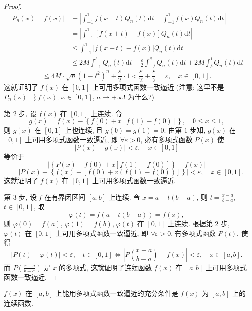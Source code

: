 \begin{proof}
\[\]
\[
  \begin{aligned}
    |P_{n}(x)-f(x)|&=\left|\int_{-1}^{1}f(x+t)Q_{n}(t)\mathrm{d}t-\int_{-1}^{1}f(x)Q_{n}(t)\mathrm{d}t\right|\\
    &=\left|\int_{-1}^{1}[f(x+t)-f(x)]Q_{n}(t)\mathrm{d}t\right|\\
    &\leqslant\int_{-1}^{1}|f(x+t)-f(x)|Q_{n}(t)\mathrm{d}t\\
    &\leqslant2M\int_{-1}^{\delta}Q_{n}(t)\mathrm{d}t+\frac{\varepsilon}{2}\int_{-\delta}^{\delta}Q_{n}(t)\mathrm{d}t+2M\int_{\delta}^{1}Q_{n}(t)\mathrm{d}t
  \end{aligned}
\]
\[
  \leqslant4M\cdot\sqrt{n}(1-\delta^{2})^{n}+\frac{\varepsilon}{2}\cdot1<\frac{\varepsilon}{2}+\frac{\varepsilon}{2}=\varepsilon,\quad x\in[0,1].
\]
这就证明了 $f(x)$ 在 $[0,1]$ 上可用多项式函数一致逼近 (注意: 这里不是 $P_{n}(x)\rightrightarrows f(x)$, $x\in[0,1]$, $n\to+\infty$! 为什么?).

第 $2$ 步, 设 $f(x)$ 在 $[0,1]$ 上连续. 令
\[
  g(x)=f(x)-\left\{f(0)+x[f(1)-f(0)]\right\},\quad0\leqslant x\leqslant1,
\]
则 $g(x)$ 在 $[0,1]$ 上也连续, 且 $g(0)=g(1)=0$. 由第 $1$ 步知, $g(x)$ 在 $[0,1]$ 上可用多项式函数一致逼近, 即 $\forall\varepsilon>0$, 必有多项式函数 $P(x)$ 使
\[
  |P(x)-g(x)|<\varepsilon,\quad x\in[0,1]
\]
等价于
\[
  \left|\left\{P(x)+f(0)+x[f(1)-f(0)]\right\}-f(x)\right|
\]
\[
  =\left|P(x)-\left\{f(x)-\left[f(0)+x(f(1)-f(0))\right]\right\}\right|<\varepsilon,\quad x\in[0,1].
\]
这就证明了 $f(x)$ 在 $[0,1]$ 上可用多项式函数一致逼近.

第 $3$ 步, 设 $f$ 在有界闭区间 $[a,b]$ 上连续. 令 $x=a+t(b-a)$, 则 $t=\frac{x-a}{b-a}$, $t\in[0,1]$, 取
\[
  \varphi(t)=f(a+t(b-a))=f(x),
\]
则 $\varphi(0)=f(a)$, $\varphi(1)=f(b)$, $\varphi(t)$ 在 $[0,1]$ 上连续. 根据第 $2$ 步, $\varphi(t)$ 在 $[0,1]$ 上可用多项式函数一致逼近, 即 $\forall\varepsilon>0$, 有多项式函数 $P(t)$, 使得
\[
  |P(t)-\varphi(t)|<\varepsilon,\quad t\in[0,1]\Leftrightarrow\left|P\left(\frac{x-a}{b-a}\right)-f(x)\right|<\varepsilon,\quad x\in[a,b].
\]
而 $P\left(\frac{x-a}{b-a}\right)$ 是 $x$ 的多项式, 这就证明了连续函数 $f(x)$ 在 $[a,b]$ 上可用多项式函数一致逼近.
\end{proof}



\begin{theorem}\label{thm:14.3.6}
$f(x)$ 在 $[a,b]$ 上能用多项式函数一致逼近的充分条件是 $f(x)$ 为 $[a,b]$ 上的连续函数.
\end{theorem}

